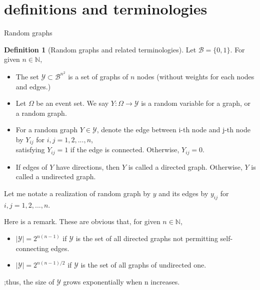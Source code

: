 \documentclass[aspectratio=169,ignorenonframetext,9pt]{beamer}
\theoremstyle{plain}
\theoremstyle{definition}
\newtheorem{defn}{Definition}[section]
\begin{document}
\section{definitions and terminologies}
\begin{frame}{Random graphs}
    \begin{defn}[Random graphs and related terminologies]
    Let $\mathcal{B}=\{0,1\}$. For given $n\in \mathbb{N}$,
    \begin{itemize}
        \item The set $\mathcal{Y} \subset \mathcal{B}^{n^2}$ is a set of graphs of $n$ nodes (without weights for each nodes and edges.)
        \item Let $\Omega$ be an event set. We say $Y: \Omega \to \mathcal{Y}$ is a random variable for a graph, or a random graph.
        \item For a random graph $Y \in \mathcal{Y}$, denote the edge between i-th node and j-th node by $Y_{ij}$ for $i,j=1,2,...,n$, \\
            satisfying $Y_{ij}=1$ if the edge is connected. Otherwise, $Y_{ij}=0$.
        \item If edges of $Y$ have directions, then $Y$ is called a directed graph. Otherwise, $Y$ is called a undirected graph.
    \end{itemize}
    \end{defn}
    Let me notate a realization of random graph by $y$ and its edges by $y_{ij}$ for $i,j=1,2,...,n$.

    Here is a remark. These are obvious that, for given $n\in \mathbb{N}$,
    \begin{itemize}
        \item $|\mathcal{Y}|=2^{n(n-1)}$ if $\mathcal{Y}$ is the set of all directed graphs not permitting self-connecting edges.
        \item $|\mathcal{Y}|=2^{n(n-1)/2}$ if $\mathcal{Y}$ is the set of all graphs of undirected one.
    \end{itemize}
    ;thus, the size of $\mathcal{Y}$ grows exponentially when n increases.
\end{frame}
\end{document}
